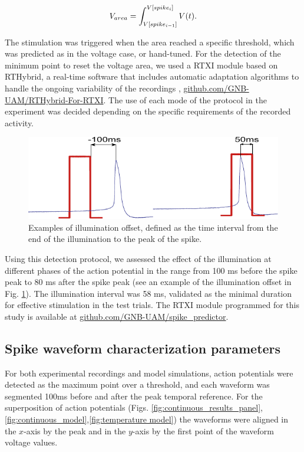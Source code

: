 \begin{equation}
	\centering 
	V_{area}=\int_{V[spike_{i-1}]}^{V[spike_{i}]}V(t).
	\label{eq:area}
\end{equation}

The stimulation was triggered when the area reached a specific threshold, which was predicted as in the voltage case, or hand-tuned. For the detection of the minimum point to reset the voltage area, we used a RTXI module based on RTHybrid, a real-time software that includes automatic adaptation algorithms to handle the ongoing variability of the recordings \parencite{amaducci_rthybrid_2019,reyes-sanchez_automatic_2020,reyes-sanchez_automatized_2023}, \href{https://github.com/GNB-UAM/rthybrid-for-rtxi/tree/master/rthybrid_burst_analysis}{github.com/GNB-UAM/RTHybrid-For-RTXI}. The use of each mode of the protocol in the experiment was decided depending on the specific requirements of the recorded activity. 

\begin{figure}[htb!]
	\includegraphics[width=\textwidth]{img/laser/offset_examples.pdf}
	\caption{Examples of illumination offset, defined as the time interval from the end of the illumination to the peak of the spike.}
	\label{fig:offset_example}
\end{figure}

Using this detection protocol, we assessed the effect of the illumination at different phases of the action potential in the range from 100 ms before the spike peak to 80 ms after the spike peak (see an example of the illumination offset in Fig. \ref{fig:offset_example}). The illumination interval was 58 ms, validated as the minimal duration for effective stimulation in the test trials. The RTXI module programmed for this study is available at \href{https://github.com/GNB-UAM/spike_predictor}{github.com/GNB-UAM/spike\_predictor}.

\subsection{Spike waveform characterization parameters} \label{sec:characterization parameters}
\label{sect:metrics}
For both experimental recordings and model simulations, action potentials were detected as the maximum point over a threshold, and each waveform was segmented 100ms before and after the peak temporal reference. For the superposition of action potentials (Figs. \ref{fig:continuous_results_panel},\ref{fig:continuous_model},\ref{fig:temperature model}) the waveforms were aligned in the $x$-axis by the peak and in the $y$-axis by the first point of the waveform voltage values.

